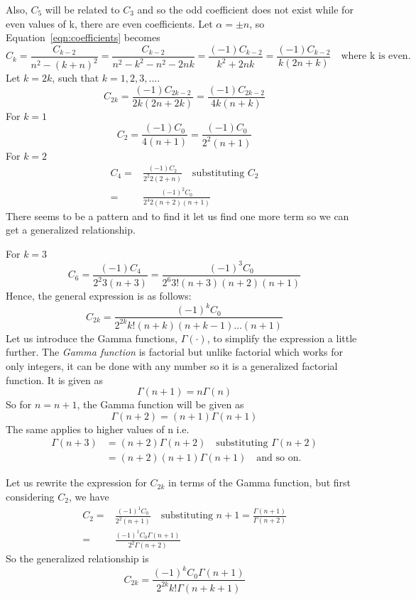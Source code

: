 Also, $C_5$ will be related to $C_3$ and so the odd coefficient does not exist while for even values of k, there are even coefficients. Let $\alpha = \pm n$, so Equation~\eqref{eqn:coefficients} becomes 
\begin{dmath*}
C_k = \frac{C_{k-2}}{n^2 - (k + n)^2} 
= \frac{C_{k-2}}{n^2 - k^2 - n^2 - 2nk}
=\frac{(-1) C_{k-2}}{k^2 + 2nk} 
= \frac{(-1) C_{k-2}}{k(2n + k)}\quad\text{where k is even.}
\end{dmath*} 
Let $k =2k$, such that $k = 1, 2, 3, \ldots$.
\begin{dmath}
C_{2k} = \frac{(-1) C_{2k-2}}{2k(2n + 2k)} 
= \frac{(-1) C_{2k-2}}{4k(n + k)}
\label{eqn:coefficients2}  
\end{dmath}
For $k=1$
\[
C_2 = \frac{(-1) C_0}{4(n + 1)} = \frac{(-1) C_0}{2^2(n + 1)}
\]
For $k = 2$
\begin{align*}
C_4 =& \frac{(-1) C_2}{2^2 2(2 + n)}\quad\text{substituting }C_2\\
=& \frac{(-1)^2 C_0}{2^4 2(n + 2)(n + 1)}
\end{align*}
There seems to be a pattern and to find it let us find one more term so we can get a generalized relationship.

For $k = 3$
\begin{dmath*}
C_6 = \frac{(-1) C_4}{2^2 3(n + 3)}
= \frac{(-1)^3 C_0}{2^6 3!(n + 3)(n + 2)(n + 1)}
\end{dmath*}
Hence, the general expression is as follows:
\begin{equation} 
C_{2k} = \frac{(-1)^k C_0}{2^{2k} k!(n + k)(n + k-1)\ldots(n + 1)}
\end{equation}
Let us introduce the Gamma functions, $\Gamma(\cdot)$, to simplify the expression a little further. The \emph{Gamma function} is factorial but unlike factorial which works for only integers, it can be done with any number so it is a generalized factorial function. It is given as 
\[
\Gamma(n + 1) = n \Gamma(n)
\]
So for $n = n + 1$, the Gamma function will be given as
\[
\Gamma(n + 2) = (n + 1)\Gamma(n + 1)
\]
The same applies to higher values of n i.e. 
\begin{align*}
\Gamma(n + 3) &= (n + 2)\Gamma(n + 2)\quad\text{substituting }\Gamma(n + 2)\\
&= (n + 2)(n + 1)\Gamma(n + 1)\quad\text{and so on.}
\end{align*}

Let us rewrite the expression for $C_{2k}$ in terms of the Gamma function, but first considering $C_2$, we have
\begin{align*}
C_2 =& \frac{(-1)^1 C_0}{2^2(n + 1)}\quad\text{substituting }n + 1 = \frac{\Gamma(n + 1)}{\Gamma(n + 2)}\\
=& \frac{(-1)^1 C_0 \Gamma(n + 1)}{2^2 \Gamma(n + 2)}
\end{align*}
So the generalized relationship is 
\begin{equation}
C_{2k} =  \frac{(-1)^k C_0 \Gamma(n + 1)}{2^{2k} k! \Gamma(n + k + 1)}
\label{eqn:coefficients3}
\end{equation}

